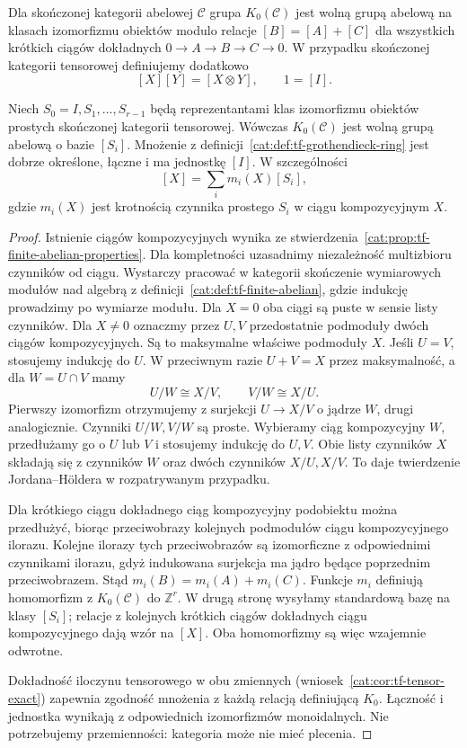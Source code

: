 \begin{definicja}\label{cat:def:tf-grothendieck-ring}
Dla skończonej kategorii abelowej $\mathcal C$ grupa $K_0(\mathcal C)$ jest wolną grupą abelową na klasach izomorfizmu obiektów modulo relacje $[B]=[A]+[C]$ dla wszystkich krótkich ciągów dokładnych $0\to A\to B\to C\to0$. W przypadku skończonej kategorii tensorowej definiujemy dodatkowo
\[
 [X][Y]=[X\otimes Y],\qquad 1=[I].
\]
\end{definicja}
\begin{stwierdzenie}\label{cat:prop:tf-grothendieck-basis}
Niech $S_0=I,S_1,\ldots,S_{r-1}$ będą reprezentantami klas izomorfizmu obiektów prostych skończonej kategorii tensorowej. Wówczas $K_0(\mathcal C)$ jest wolną grupą abelową o bazie $[S_i]$. Mnożenie z definicji~\ref{cat:def:tf-grothendieck-ring} jest dobrze określone, łączne i ma jednostkę $[I]$. W szczególności
\[
 [X]=\sum_i m_i(X)[S_i],
\]
gdzie $m_i(X)$ jest krotnością czynnika prostego $S_i$ w ciągu kompozycyjnym $X$.
\end{stwierdzenie}
\begin{proof}
Istnienie ciągów kompozycyjnych wynika ze stwierdzenia~\ref{cat:prop:tf-finite-abelian-properties}. Dla kompletności uzasadnimy niezależność multizbioru czynników od ciągu. Wystarczy pracować w kategorii skończenie wymiarowych modułów nad algebrą z definicji~\ref{cat:def:tf-finite-abelian}, gdzie indukcję prowadzimy po wymiarze modułu. Dla $X=0$ oba ciągi są puste w sensie listy czynników. Dla $X\neq0$ oznaczmy przez $U,V$ przedostatnie podmoduły dwóch ciągów kompozycyjnych. Są to maksymalne właściwe podmoduły $X$. Jeśli $U=V$, stosujemy indukcję do $U$. W przeciwnym razie $U+V=X$ przez maksymalność, a dla $W=U\cap V$ mamy
\[
 U/W\cong X/V,\qquad V/W\cong X/U.
\]
Pierwszy izomorfizm otrzymujemy z surjekcji $U\to X/V$ o jądrze $W$, drugi analogicznie. Czynniki $U/W,V/W$ są proste. Wybieramy ciąg kompozycyjny $W$, przedłużamy go o $U$ lub $V$ i stosujemy indukcję do $U,V$. Obie listy czynników $X$ składają się z czynników $W$ oraz dwóch czynników $X/U,X/V$. To daje twierdzenie Jordana--Höldera w rozpatrywanym przypadku.

Dla krótkiego ciągu dokładnego ciąg kompozycyjny podobiektu można przedłużyć, biorąc przeciwobrazy kolejnych podmodułów ciągu kompozycyjnego ilorazu. Kolejne ilorazy tych przeciwobrazów są izomorficzne z odpowiednimi czynnikami ilorazu, gdyż indukowana surjekcja ma jądro będące poprzednim przeciwobrazem. Stąd $m_i(B)=m_i(A)+m_i(C)$. Funkcje $m_i$ definiują homomorfizm z $K_0(\mathcal C)$ do $\mathbb Z^r$. W drugą stronę wysyłamy standardową bazę na klasy $[S_i]$; relacje z kolejnych krótkich ciągów dokładnych ciągu kompozycyjnego dają wzór na $[X]$. Oba homomorfizmy są więc wzajemnie odwrotne.

Dokładność iloczynu tensorowego w obu zmiennych (wniosek~\ref{cat:cor:tf-tensor-exact}) zapewnia zgodność mnożenia z każdą relacją definiującą $K_0$. Łączność i jednostka wynikają z odpowiednich izomorfizmów monoidalnych. Nie potrzebujemy przemienności: kategoria może nie mieć plecenia.
\end{proof}

